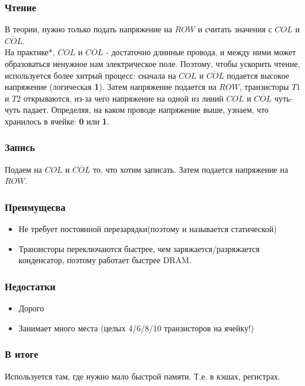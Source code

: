 \documentclass[12pt, a4paper]{article}
\begin{document}
\subsubsection{Чтение}
В теории, нужно только подать напряжение на $ROW$ и считать значения с $COL$ и $\overline{COL}$.\\
На практике*, $COL$ и $\overline{COL}$ - достаточно длинные провода, и между ними может образоваться ненужное нам электрическое поле. Поэтому, чтобы ускорить чтение, используется более хитрый процесс: сначала на $COL$ и $\overline{COL}$ подается высокое напряжение (логическая \textbf{1}). Затем напряжение подается на $ROW$, транзисторы $T1$ и $T2$ открываются, из-за чего напряжение на одной из линий $COL$ и $\overline{COL}$ чуть-чуть падает. Определяя, на каком проводе напряжение выше, узнаем, что хранилось в ячейке: \textbf{0} или \textbf{1}.
\subsubsection{Запись}
Подаем на $COL$ и $\overline{COL}$ то, что хотим записать. Затем подается напряжение на $ROW$.
\subsubsection{Преимущесва}
\begin{itemize}
    \item Не требует постоянной перезарядки(поэтому и называется статической)
    \item Транзисторы переключаются быстрее, чем заряжается/разряжается конденсатор, поэтому работает быстрее DRAM.
\end{itemize}
\subsubsection{Недостатки}
\begin{itemize}
    \item Дорого
    \item Занимает много места (целых 4/6/8/10 транзисторов на ячейку!)
\end{itemize}
\subsubsection{В итоге}
Используется там, где нужно мало быстрой памяти. Т.е. в кэшах, регистрах.
\end{document}
